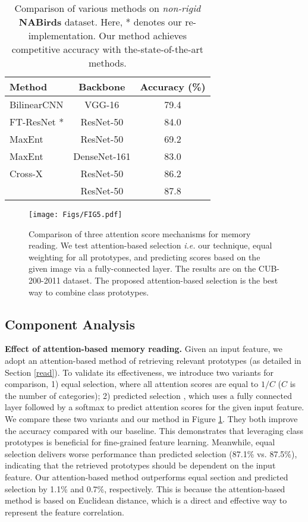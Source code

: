 \documentclass[journal]{IEEEtran}
\begin{document}
\setlength{\tabcolsep}{13pt}
\begin{table}[t]
\caption{Comparison of various methods on \emph{non-rigid} \textbf{NABirds} dataset. Here, * denotes our re-implementation. Our method achieves competitive accuracy with the-state-of-the-art methods.}
\small
\begin{center}
\begin{tabular}{|l|c|c|}
\hline
Method    & Backbone & Accuracy (\%)\\
\hline\hline
BilinearCNN \cite{LinRM18} & VGG-16 & 79.4 \\
FT-ResNet \cite{he2016deep}* & ResNet-50 & 84.0 \\
MaxEnt \cite{dubey2018maximum} & ResNet-50 & 69.2 \\
MaxEnt \cite{dubey2018maximum} & DenseNet-161 & 83.0 \\
Cross-X \cite{luo2019cross} & ResNet-50 & 86.2 \\
\hline
 \rowcolor{mygray}{CMN (ours)}    & ResNet-50    &{87.8}\\
\hline
\end{tabular}
\end{center}
\label{tab5}
\end{table}

\begin{figure}[t]
    \centering
   {\texttt{[image: Figs/FIG5.pdf]}}\caption{Comparison of three attention score mechanisms for memory reading. We test attention-based selection \emph{i.e.} our technique, equal weighting for all prototypes, and predicting scores based on the given image via a fully-connected layer. The results are on the CUB-200-2011 dataset. The proposed attention-based selection is the best way to combine class prototypes.
    }
    \label{fig_ab}\end{figure}


\subsection{Component Analysis}
\textbf{Effect of attention-based memory reading.}
Given an input feature, we adopt an attention-based method of retrieving relevant prototypes (as detailed in Section \ref{read}). To validate its effectiveness, we introduce two variants for comparison, 1) equal selection, where all attention scores are equal to $1/C$ ($C$ is the number of categories); 2) predicted selection \cite{li2016learning}, which uses a fully connected layer followed by a softmax to predict attention scores for the given input feature. 
We compare these two variants and our method in Figure \ref{fig_ab}. They both improve the accuracy compared with our baseline. This demonstrates that leveraging class prototypes is beneficial for fine-grained feature learning. Meanwhile, equal selection delivers worse performance than predicted selection (87.1\% vs. 87.5\%), indicating that the retrieved prototypes should be dependent on the input feature.
Our attention-based method outperforms equal section and predicted selection by 1.1\% and 0.7\%, respectively. This is because the attention-based method is based on Euclidean distance, which is a direct and effective way to represent the feature correlation.
\end{document}
